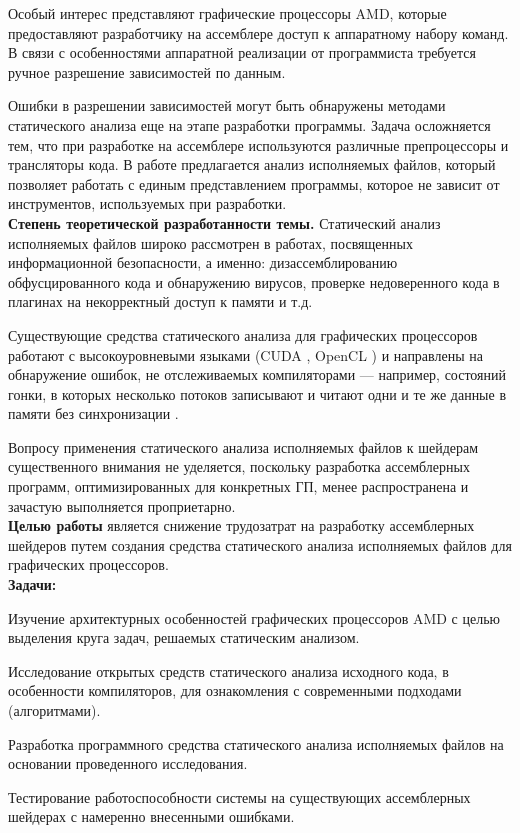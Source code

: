 \documentclass[a4paper,14pt]{extarticle}
\newcommand{\topic}[1]{\textbf{#1.}}
\begin{document}
Особый интерес представляют графические процессоры AMD, которые предоставляют разработчику
на ассемблере доступ к аппаратному набору команд. В связи с особенностями аппаратной
реализации от программиста требуется ручное разрешение зависимостей по данным.

Ошибки в разрешении зависимостей могут быть обнаружены методами статического анализа
еще на этапе разработки программы. Задача осложняется тем, что при разработке
на ассемблере используются различные препроцессоры и трансляторы кода. В работе
предлагается анализ исполняемых файлов, который позволяет работать с единым
представлением программы, которое не зависит от инструментов, используемых при разработки.\\

\topic{Степень теоретической разработанности темы} Статический анализ исполняемых файлов
широко рассмотрен в работах, посвященных информационной безопасности, а именно:
дизассемблированию обфусцированного кода и обнаружению вирусов,
проверке недоверенного кода в плагинах на некорректный доступ к памяти и т.д. \cite{static-analysis-binary}

Существующие средства статического анализа для графических процессоров работают с
высокоуровневыми языками (CUDA \cite{cuda}, OpenCL \cite{opencl}) и направлены на обнаружение ошибок,
не отслеживаемых компиляторами — например, состояний гонки, в которых несколько потоков
записывают и читают одни и те же данные в памяти без синхронизации \cite{gpu-static-verification}.

Вопросу применения статического анализа исполняемых файлов к шейдерам существенного внимания
не уделяется, поскольку разработка ассемблерных программ, оптимизированных для конкретных ГП,
менее распространена и зачастую выполняется проприетарно.\\

\textbf{Целью работы} является снижение трудозатрат на разработку ассемблерных шейдеров
путем создания средства статического анализа исполняемых файлов для графических процессоров.\\

\textbf{Задачи:}
\begin{ul}
\item Изучение архитектурных особенностей графических процессоров AMD с целью выделения
круга задач, решаемых статическим анализом.
\item Исследование открытых средств статического анализа исходного кода, в особенности
компиляторов, для ознакомления с современными подходами (алгоритмами).
\item Разработка программного средства статического анализа исполняемых файлов
на основании проведенного исследования.
\item Тестирование работоспособности системы на существующих ассемблерных шейдерах
с намеренно внесенными ошибками.
\end{ul}\ %
\end{document}
